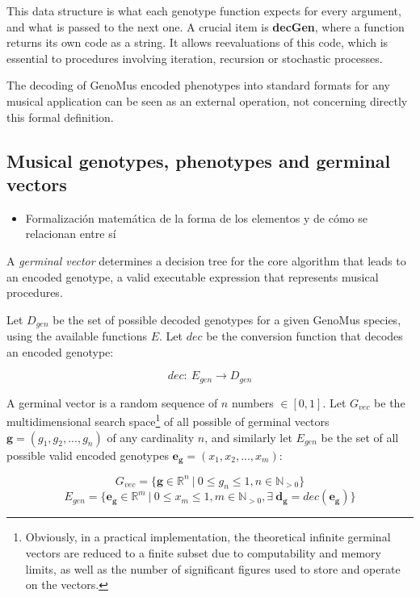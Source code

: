 \documentclass{article}
\renewcommand{\vec}[1]{\mathbf{#1}}
\begin{document}
This data structure is what each genotype function expects for every argument, and what is passed to the next one. A crucial item is \textbf{decGen}, where a function returns its own code as a string. It allows reevaluations of this code, which is essential to procedures involving iteration, recursion or stochastic processes.

The decoding of GenoMus encoded phenotypes into standard formats for any musical application can be seen as an external operation, not concerning directly this formal definition. 




\subsection{Musical genotypes, phenotypes and germinal vectors}

{\color{gray}
\begin{itemize}
\item Formalización matemática de la forma de los elementos y de cómo se relacionan entre sí
\end{itemize}
}

A \emph{germinal vector} determines a decision tree for the core algorithm that leads to an encoded genotype, a valid executable expression that represents musical procedures.

Let $D_{gen}$ be the set of possible decoded genotypes for a given GenoMus species, using the available functions $E$. Let $dec$ be the conversion function that decodes an encoded genotype:

$$dec:\ E_{gen}\to D_{gen}$$



A germinal vector is a random sequence of $n$ numbers $\in [0, 1]$.  Let $G_{vec}$ be the multidimensional search space\footnote{Obviously, in a practical implementation, the theoretical infinite germinal vectors are reduced to a finite subset due to computability and memory limits, as well as the number of significant figures used to store and operate on the vectors.} of all possible of germinal vectors  $\vec{g} = (g_1, g_2, ..., g_n)$ of any cardinality $n$, and similarly let $E_{gen}$ be the set of all possible valid encoded genotypes $\vec{e_g} = (x_1, x_2, ..., x_m)$:

$$ G_{vec} = \{\vec{g} \in \mathbb{R}^n \: | \: 0 \leq g_n \leq1, n \in \mathbb N_{> 0} \} $$
$$ E_{gen} = \{\vec{e_g} \in \mathbb{R}^m \: | \: 0 \leq x_m \leq1, m \in \mathbb N_{> 0}, \exists \: \vec{d_g} = dec(\vec{e_g}) \} $$
\end{document}
